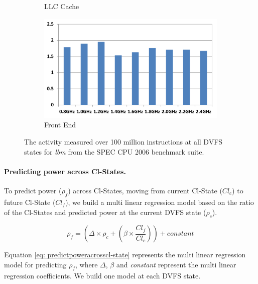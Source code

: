 \begin{figure}[htb]
\begin{subfigure}{.48\textwidth}
       \caption{LLC Cache}
        \label{fig: lbml3}
    \end{subfigure}
    \begin{subfigure}{.48\textwidth}
        \centering
        \includegraphics[width=\textwidth]{Chapter3/Figs/activity/FE.pdf}
        \caption{Front End}
        \label{fig: lbmfe}
    \end{subfigure}
    \caption[Microarchitectural component activity ratio for a SPEC CPU 2006 benchmark]{ The activity measured over 100 million instructions at all DVFS states for \textit{lbm} from the SPEC CPU 2006 benchmark suite.}
    \label{fig: activity ratio}
\end{figure}

\paragraph{Predicting power across Cl-States.} To predict power ($\rho_\mathit{f}$)
across Cl-States, moving from current Cl-State ($Cl_\mathit{c}$) to future Cl-State
($Cl_\mathit{f}$), we build a multi linear regression model based on the ratio of the
Cl-States and predicted power at the current DVFS state ($\rho_\mathit{c}$).

\begin{equation}%
    \label{eq: predictpoweracrosscl-state}
    \rho_{\mathit{f}} = (\Delta \times \rho_{\mathit{c}} + (\beta \times \frac{Cl_{\mathit{f}}}{Cl_{\mathit{c}}})) + constant
\end{equation}

Equation \ref{eq: predictpoweracrosscl-state} represents the multi linear regression model
for predicting $\rho_\mathit{f}$, where $\Delta$, $\beta$ and {\it constant} represent the
multi linear regression coefficients. We build one model at each DVFS state.


